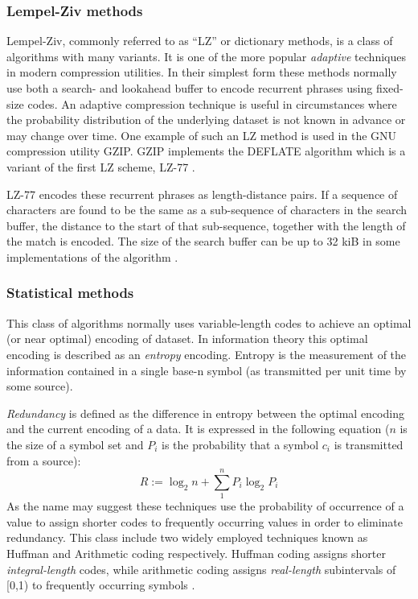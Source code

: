 \subsubsection{Lempel-Ziv methods}
Lempel-Ziv, commonly referred to as “LZ” or dictionary methods, is a class of algorithms with many variants. It is one of the more popular \textit{adaptive} techniques 
in modern compression utilities. In their simplest form these methods normally use both a search- and lookahead buffer to encode recurrent phrases using fixed-size codes. An 
adaptive compression technique is useful in circumstances where the probability distribution of the underlying dataset is not known in advance or may change over time. 
One example of such an LZ method is used in the GNU compression utility GZIP. GZIP implements the DEFLATE algorithm which is a variant of the first LZ scheme, LZ-77 
\cite[ch. 3]{salomon2004data}.

LZ-77 encodes these recurrent phrases as length-distance pairs. If a sequence of characters are found to be the same as a sub-sequence of characters in the search buffer, the 
distance to the start of that sub-sequence, together with the length of the match is encoded. The size of the search buffer can be up to 32 kiB in some implementations of the 
algorithm \cite[ch. 3]{salomon2004data}.
\subsubsection{Statistical methods}
This class of algorithms normally uses variable-length codes to achieve an optimal (or near optimal) encoding of dataset. In information theory this optimal encoding is 
described as an \textit{entropy} encoding. Entropy is the measurement of the information contained in a single base-n symbol (as transmitted per unit time by some source).

\textit{Redundancy} is defined as the difference in entropy between the optimal encoding and the current encoding of a data. It is expressed in the following equation  
($n$ is the size of a symbol set and $P_{i}$ is the probability that a symbol $c_{i}$ is transmitted from a source)\cite[p. 46 - 47]{salomon2004data}:
\begin{equation}
 R := \log_2n + \sum_1^nP_i\log_2P_i
\end{equation}
As the name may suggest these techniques use the probability of occurrence of a value to assign shorter codes to frequently occurring values in order to eliminate redundancy. This 
class include two widely employed techniques known as Huffman and Arithmetic coding respectively. Huffman coding assigns shorter \textit{integral-length} codes, while arithmetic 
coding assigns \textit{real-length} subintervals of [0,1) to frequently occurring symbols \cite{Witten:1987:ACD:214762.214771}\cite[ch. 2]{salomon2004data}.

